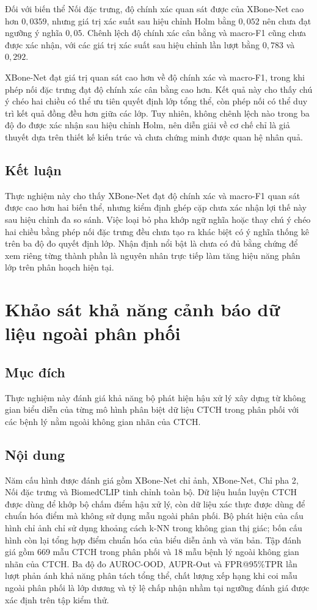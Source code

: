 Đối với biến thể Nối đặc trưng, độ chính xác quan sát được của XBone-Net cao hơn $0{,}0359$, nhưng giá trị xác suất sau hiệu chỉnh Holm bằng $0{,}052$ nên chưa đạt ngưỡng ý nghĩa $0{,}05$. Chênh lệch độ chính xác cân bằng và macro-F1 cũng chưa được xác nhận, với các giá trị xác suất sau hiệu chỉnh lần lượt bằng $0{,}783$ và $0{,}292$.

XBone-Net đạt giá trị quan sát cao hơn về độ chính xác và macro-F1, trong khi phép nối đặc trưng đạt độ chính xác cân bằng cao hơn. Kết quả này cho thấy chú ý chéo hai chiều có thể ưu tiên quyết định lớp tổng thể, còn phép nối có thể duy trì kết quả đồng đều hơn giữa các lớp. Tuy nhiên, không chênh lệch nào trong ba độ đo được xác nhận sau hiệu chỉnh Holm, nên diễn giải về cơ chế chỉ là giả thuyết dựa trên thiết kế kiến trúc và chưa chứng minh được quan hệ nhân quả.

\subsection{Kết luận}
Thực nghiệm này cho thấy XBone-Net đạt độ chính xác và macro-F1 quan sát được cao hơn hai biến thể, nhưng kiểm định ghép cặp chưa xác nhận lợi thế này sau hiệu chỉnh đa so sánh. Việc loại bỏ pha khớp ngữ nghĩa hoặc thay chú ý chéo hai chiều bằng phép nối đặc trưng đều chưa tạo ra khác biệt có ý nghĩa thống kê trên ba độ đo quyết định lớp. Nhận định nổi bật là chưa có đủ bằng chứng để xem riêng từng thành phần là nguyên nhân trực tiếp làm tăng hiệu năng phân lớp trên phân hoạch hiện tại.

\section{Khảo sát khả năng cảnh báo dữ liệu ngoài phân phối}
\label{subsec:ablation_ood_results}

\subsection{Mục đích}
Thực nghiệm này đánh giá khả năng bộ phát hiện hậu xử lý xây dựng từ không gian biểu diễn của từng mô hình phân biệt dữ liệu CTCH trong phân phối với các bệnh lý nằm ngoài không gian nhãn của CTCH.

\subsection{Nội dung}
Năm cấu hình được đánh giá gồm XBone-Net chỉ ảnh, XBone-Net, Chỉ pha 2, Nối đặc trưng và BiomedCLIP tinh chỉnh toàn bộ. Dữ liệu huấn luyện CTCH được dùng để khớp bộ chấm điểm hậu xử lý, còn dữ liệu xác thực được dùng để chuẩn hóa điểm mà không sử dụng mẫu ngoài phân phối. Bộ phát hiện của cấu hình chỉ ảnh chỉ sử dụng khoảng cách k-NN trong không gian thị giác; bốn cấu hình còn lại tổng hợp điểm chuẩn hóa của biểu diễn ảnh và văn bản. Tập đánh giá gồm 669 mẫu CTCH trong phân phối và 18 mẫu bệnh lý ngoài không gian nhãn của CTCH. Ba độ đo AUROC-OOD, AUPR-Out và FPR@95\%TPR lần lượt phản ánh khả năng phân tách tổng thể, chất lượng xếp hạng khi coi mẫu ngoài phân phối là lớp dương và tỷ lệ chấp nhận nhầm tại ngưỡng đánh giá được xác định trên tập kiểm thử.

